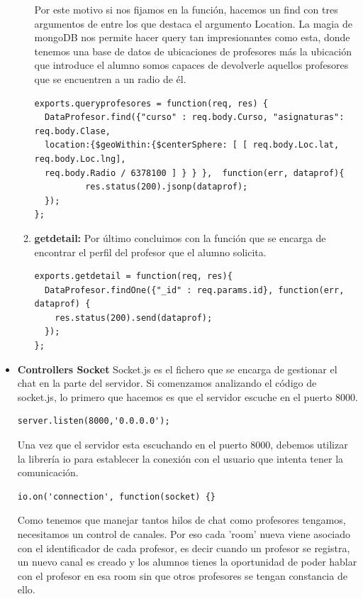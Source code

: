 \begin{itemize}
\begin{enumerate}
    Por este motivo si nos fijamos en la función, hacemos un find con tres argumentos de entre los que destaca el argumento Location. La magia de mongoDB nos permite hacer query tan impresionantes como esta, donde tenemos una base de datos de ubicaciones de profesores más la ubicación que introduce el alumno somos capaces de devolverle aquellos profesores que se encuentren a un radio de él.

\begin{lstlisting}
exports.queryprofesores = function(req, res) {
  DataProfesor.find({"curso" : req.body.Curso, "asignaturas": req.body.Clase,
  location:{$geoWithin:{$centerSphere: [ [ req.body.Loc.lat, req.body.Loc.lng],
  req.body.Radio / 6378100 ] } } },  function(err, dataprof){
	      res.status(200).jsonp(dataprof);
  });
};
\end{lstlisting}
    
    \item \textbf {getdetail: } Por último concluimos con la función que se encarga de encontrar el perfil del profesor que el alumno solicita. 

\begin{lstlisting}
exports.getdetail = function(req, res){
  DataProfesor.findOne({"_id" : req.params.id}, function(err, dataprof) {
    res.status(200).send(dataprof);
  });
};

\end{lstlisting}
    
    
\end{enumerate}
\item \textbf{Controllers Socket} Socket.js es el fichero que se encarga de gestionar el chat en la parte del servidor. Si comenzamos analizando el código de socket.js, lo primero que hacemos es que el servidor escuche en el puerto 8000.
\begin{lstlisting}
server.listen(8000,'0.0.0.0');
\end{lstlisting}

Una vez que el servidor esta escuchando en el puerto 8000, debemos utilizar la librería io para establecer la conexión con el usuario que intenta tener la comunicación.

\begin{lstlisting}
io.on('connection', function(socket) {}
\end{lstlisting}

Como tenemos que manejar tantos hilos de chat como profesores tengamos, necesitamos un control de canales. Por eso cada 'room' nueva viene asociado con el identificador de cada profesor, es decir cuando un profesor se registra, un nuevo canal es creado y los alumnos tienes la oportunidad de poder hablar con el profesor en esa room sin que otros profesores se tengan constancia de ello.


\end{itemize}
